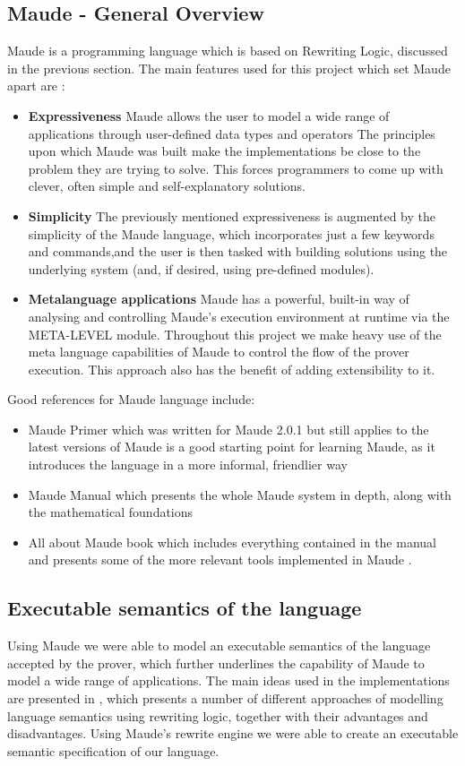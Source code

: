 \documentclass[12pt,a4paper]{article}
\begin{document}
\subsection{Maude - General Overview}
Maude is a programming language which is based on Rewriting Logic, discussed in the previous section. 
The main features used for this project which set Maude apart are :
\begin{itemize}
	\item \textbf{Expressiveness}
	\subitem Maude allows the user to model a wide range of applications through user-defined data types and operators
	\subitem The principles upon which Maude was built make the implementations be close to the problem they are trying to solve. This forces programmers to come up with clever, often simple and self-explanatory solutions.
	\item \textbf{Simplicity}
	\subitem
	The previously mentioned expressiveness is augmented by the simplicity of the Maude language, which incorporates just a few keywords and commands,and the user is then tasked with building solutions using the underlying system (and, if desired, using pre-defined modules).
	\item \textbf{Metalanguage applications}
	\subitem
	Maude has a powerful, built-in way of analysing and controlling Maude's execution environment at runtime via the META-LEVEL module. Throughout this project we make heavy use of the meta language capabilities of Maude to control the flow of the prover execution. This approach also has the benefit of adding extensibility to it.
\end{itemize} 
Good references for Maude language include:
\begin{itemize}
	\item Maude Primer \cite{primer} which was written for Maude 2.0.1 but still applies to the latest versions of Maude is a good starting point for learning Maude, as it introduces the language in a more informal, friendlier way
	\item Maude Manual \cite{manual} which presents the whole Maude system in depth, along with the mathematical foundations
	\item All about Maude book \cite{allAboutMaude} which includes everything contained in the manual and presents some of the more relevant tools implemented in Maude .
\end{itemize}
\subsection{Executable semantics of the language}
Using Maude we were able to model an executable semantics of the language accepted by the prover, which further underlines the capability of Maude to model a wide range of applications. The main ideas used in the implementations are presented in \cite{REWRITING}, which presents a number of different approaches of modelling language semantics using rewriting logic, together with their advantages and disadvantages. Using Maude's rewrite engine we were able to create an executable semantic specification of our language. \\
\end{document}
